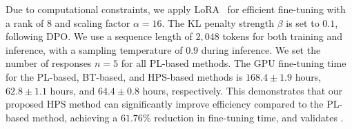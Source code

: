
  Due to computational constraints, we apply LoRA~\cite{lora} for efficient fine-tuning with a rank of $8$ and scaling factor $\alpha = 16$. %
 The KL penalty strength $\beta$ is set to $0.1$, following DPO.  
We use a sequence length of $2,048$ tokens for both training and inference, with a sampling temperature of $0.9$ during inference. We set the number of responses $n\!=\!5$ for all PL-based methods. The GPU fine-tuning time for the PL-based, BT-based, and HPS-based methods is $168.4 \!\pm\! 1.9$ hours, $62.8 \!\pm\! 1.1$ hours, and $64.4 \!\pm\! 0.8$ hours, respectively. This demonstrates that our proposed HPS method can significantly improve efficiency compared to the PL-based method, achieving a $61.76\%$ reduction in fine-tuning time, and validates .
\vspace{-8pt}
